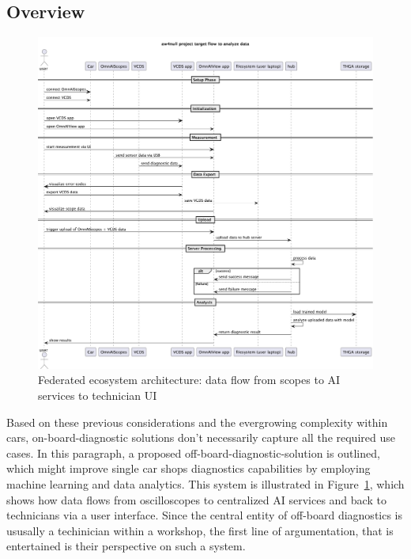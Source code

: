 \subsection{Overview}
\begin{figure}[t]
  \centering
  \includegraphics[width=\textwidth]{figures/aw4null_project_target_flow_to_analyze_data.pdf}
  \caption{Federated ecosystem architecture: data flow from scopes to AI services to technician UI}
  \label{fig:system_architecture}
\end{figure}
Based on these previous considerations and the evergrowing complexity within cars, on-board-diagnostic solutions don't necessarily capture all the required use cases.
In this paragraph, a proposed off-board-diagnostic-solution is outlined, which might improve single car shops diagnostics capabilities by employing machine learning and data analytics. 
This system is illustrated in Figure~\ref{fig:system_architecture}, which shows how data flows from oscilloscopes to centralized AI services and back to technicians via a user interface.
Since the central entity of off-board diagnostics is ususally a techinician within a workshop, the first line of argumentation, that is entertained is their perspective on such a system.

